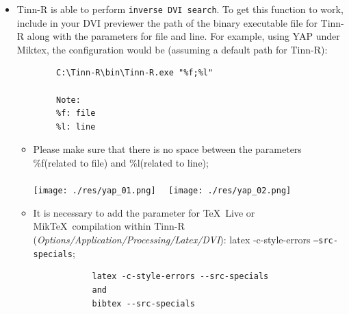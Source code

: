 \begin{itemize}
  \item Tinn-R is able to perform \texttt{inverse DVI search}. To get this
    function to work, include in your DVI previewer the path of the
    binary executable file for Tinn-R along with the parameters for
    file and line.  For example, using YAP under Miktex, the configuration
    would be (assuming a default path for Tinn-R):

    \begin{footnotesize}
      \begin{verbatim}
        C:\Tinn-R\bin\Tinn-R.exe "%f;%l"
        
        Note:
        %f: file
        %l: line
      \end{verbatim}
    \end{footnotesize}

    \begin{itemize}
      \item Please make sure that there is no space between the
        parameters \%f(related to file) and \%l(related to line);\\\\
        \texttt{[image: ./res/yap\_01.png]}~~
        \texttt{[image: ./res/yap\_02.png]}\\
      \item It is necessary to add the parameter for \TeX~Live or Mik\TeX~compilation
        within Tinn-R (\textit{Options/Application/Processing/Latex/DVI}):
        latex -c-style-errors \texttt{--src-specials};

        \begin{footnotesize}
          \begin{verbatim}
            latex -c-style-errors --src-specials
            and
            bibtex --src-specials
          \end{verbatim}
        \end{footnotesize}


\end{itemize}
\end{itemize}

